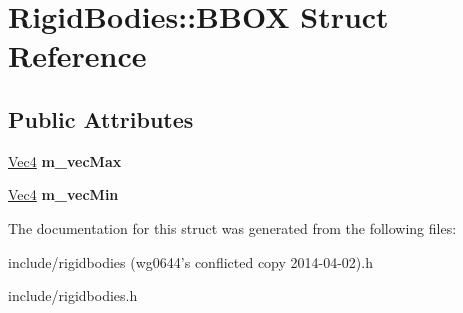 \hypertarget{structRigidBodies_1_1BBOX}{
\section{RigidBodies::BBOX Struct Reference}
\label{structRigidBodies_1_1BBOX}
}
\subsection*{Public Attributes}
\begin{DoxyCompactItemize}
\item 
\hypertarget{structRigidBodies_1_1BBOX_a4d6ab1e4ad77eb81c7484ea919a02a47}{
\hyperlink{classVec4}{Vec4} {\bfseries m\_\-vecMax}}
\label{structRigidBodies_1_1BBOX_a4d6ab1e4ad77eb81c7484ea919a02a47}

\item 
\hypertarget{structRigidBodies_1_1BBOX_ab9566d4603e14f38f82a6a175b386827}{
\hyperlink{classVec4}{Vec4} {\bfseries m\_\-vecMin}}
\label{structRigidBodies_1_1BBOX_ab9566d4603e14f38f82a6a175b386827}

\end{DoxyCompactItemize}


The documentation for this struct was generated from the following files:\begin{DoxyCompactItemize}
\item 
include/rigidbodies (wg0644's conflicted copy 2014-\/04-\/02).h\item 
include/rigidbodies.h\end{DoxyCompactItemize}
